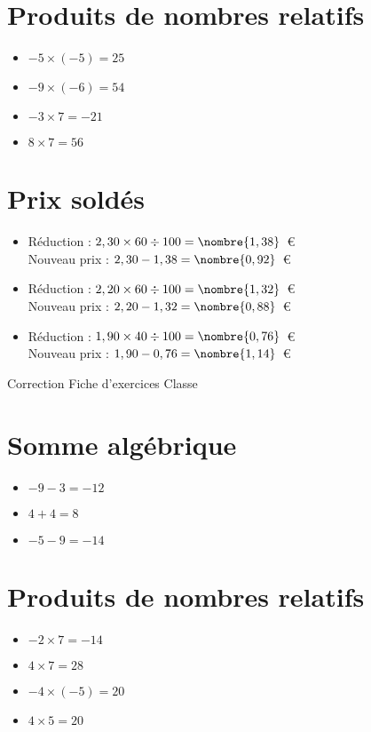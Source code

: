 \documentclass[a4paper,11pt,fleqn]{article}
\begin{document}
\section{Produits de nombres relatifs}
\begin{itemize}

  \item $-5\times(-5)=25$
  \item $-9\times(-6)=54$
  \item $-3\times7=-21$
  \item $8\times7=56$
\end{itemize}

\section{Prix soldés}
\begin{itemize}

  \item Réduction : $2,30\times60\div100=\nombre{1,38}$~€\\
  Nouveau prix : $2,30-1,38=\nombre{0,92}$~€
  \item Réduction : $2,20\times60\div100=\nombre{1,32}$~€\\
  Nouveau prix : $2,20-1,32=\nombre{0,88}$~€
  \item Réduction : $1,90\times40\div100=\nombre{0,76}$~€\\
  Nouveau prix : $1,90-0,76=\nombre{1,14}$~€
\end{itemize}
\newpage
\setcounter{exo}{0}
\setcounter{section}{0}
{Correction} \hfill {\huge Fiche d'exercices } \hfill {Classe}

\section{Somme algébrique}
\begin{itemize}

  \item $-9 -3=-12$
  \item $4 +4=8$
  \item $-5 -9=-14$
\end{itemize}

\section{Produits de nombres relatifs}
\begin{itemize}

  \item $-2\times7=-14$
  \item $4\times7=28$
  \item $-4\times(-5)=20$
  \item $4\times5=20$
\end{itemize}
\end{document}
